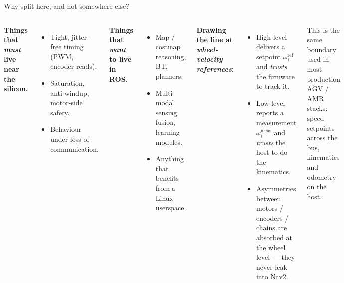 \begin{frame}{Why split here, and not somewhere else?}
  \begin{columns}[T,onlytextwidth]
      \textbf{Things that \emph{must} live near the silicon.}
      \begin{itemize}\setlength\itemsep{2pt}
        \item Tight, jitter-free timing (PWM, encoder reads).
        \item Saturation, anti-windup, motor-side safety.
        \item Behaviour under loss of communication.
      \end{itemize}

      \textbf{Things that \emph{want} to live in ROS.}
      \begin{itemize}\setlength\itemsep{2pt}
        \item Map / costmap reasoning, BT, planners.
        \item Multi-modal sensing fusion, learning modules.
        \item Anything that benefits from a Linux userspace.
      \end{itemize}

      \textbf{Drawing the line at \emph{wheel-velocity references}:}
      \begin{itemize}\setlength\itemsep{2pt}
        \item \alert{High-level} delivers a setpoint \(\omega^{\text{ref}}_i\)
              and \emph{trusts} the firmware to track it.
        \item \alert{Low-level} reports a measurement
              \(\omega^{\text{meas}}_i\) and \emph{trusts} the host to do the
              kinematics.
        \item Asymmetries between motors / encoders / chains are absorbed at
              the wheel level — they never leak into Nav2.
      \end{itemize}

      \vspace{0.4em}
      \footnotesize\textcolor{black!60}{This is the same boundary used in
      most production AGV / AMR stacks: speed setpoints across the bus,
      kinematics and odometry on the host.}
  \end{columns}
\end{frame}

